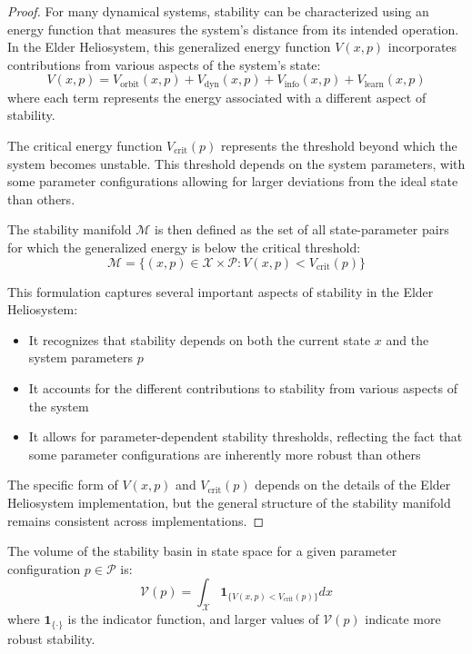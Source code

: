 \begin{proof}
For many dynamical systems, stability can be characterized using an energy function that measures the system's distance from its intended operation. In the Elder Heliosystem, this generalized energy function $V(x, p)$ incorporates contributions from various aspects of the system's state:
\begin{equation}
V(x, p) = V_{\text{orbit}}(x, p) + V_{\text{dyn}}(x, p) + V_{\text{info}}(x, p) + V_{\text{learn}}(x, p)
\end{equation}
where each term represents the energy associated with a different aspect of stability.

The critical energy function $V_{\text{crit}}(p)$ represents the threshold beyond which the system becomes unstable. This threshold depends on the system parameters, with some parameter configurations allowing for larger deviations from the ideal state than others.

The stability manifold $\mathcal{M}$ is then defined as the set of all state-parameter pairs for which the generalized energy is below the critical threshold:
\begin{equation}
\mathcal{M} = \{(x, p) \in \mathcal{X} \times \mathcal{P} : V(x, p) < V_{\text{crit}}(p)\}
\end{equation}

This formulation captures several important aspects of stability in the Elder Heliosystem:
\begin{itemize}
    \item It recognizes that stability depends on both the current state $x$ and the system parameters $p$
    \item It accounts for the different contributions to stability from various aspects of the system
    \item It allows for parameter-dependent stability thresholds, reflecting the fact that some parameter configurations are inherently more robust than others
\end{itemize}

The specific form of $V(x, p)$ and $V_{\text{crit}}(p)$ depends on the details of the Elder Heliosystem implementation, but the general structure of the stability manifold remains consistent across implementations.
\end{proof}

\begin{theorem}
The volume of the stability basin in state space for a given parameter configuration $p \in \mathcal{P}$ is:
\begin{equation}
\mathcal{V}(p) = \int_{\mathcal{X}} \mathbf{1}_{\{V(x, p) < V_{\text{crit}}(p)\}} dx
\end{equation}
where $\mathbf{1}_{\{\cdot\}}$ is the indicator function, and larger values of $\mathcal{V}(p)$ indicate more robust stability.
\end{theorem}

